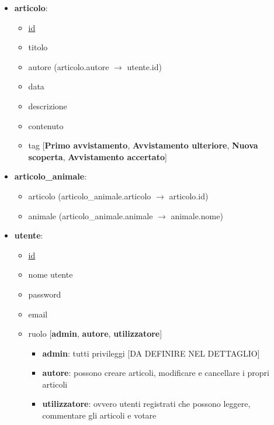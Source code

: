     \begin{itemize}
        \item \textbf{articolo}:
        \begin{itemize}
            \item \underline{id}
            \item titolo
            \item autore (articolo.autore $\rightarrow$ utente.id)
            \item data
            \item descrizione
            \item contenuto
            \item tag [\textbf{Primo avvistamento}, \textbf{Avvistamento ulteriore}, \textbf{Nuova scoperta}, \textbf{Avvistamento accertato}]
        \end{itemize}

        \item \textbf{articolo\_animale}:
        \begin{itemize}
            \item articolo (articolo\_animale.articolo $\rightarrow$ articolo.id)
            \item animale (articolo\_animale.animale $\rightarrow$ animale.nome)
        \end{itemize}

        \item \textbf{utente}:
        \begin{itemize}
            \item \underline{id}
            \item nome utente
            \item password
            \item email
            \item ruolo [\textbf{admin}, \textbf{autore}, \textbf{utilizzatore}]
            \begin{itemize}
                \item \textbf{admin}: tutti privileggi [DA DEFINIRE NEL DETTAGLIO]
                \item \textbf{autore}: possono creare articoli, modificare e cancellare i propri articoli
                \item \textbf{utilizzatore}: ovvero utenti registrati che possono leggere, commentare gli articoli e votare
            \end{itemize}
        \end{itemize}


\end{itemize}
